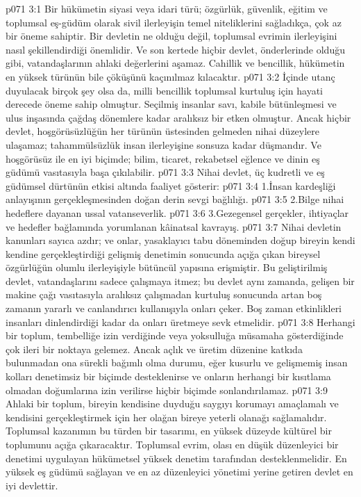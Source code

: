 \vs p071 3:1 Bir hükümetin siyasi veya idari türü; özgürlük, güvenlik, eğitim ve toplumsal eş\hyp{}güdüm olarak sivil ilerleyişin temel niteliklerini sağladıkça, çok az bir öneme sahiptir. Bir devletin ne olduğu değil, toplumsal evrimin ilerleyişini nasıl şekillendirdiği önemlidir. Ve son kertede hiçbir devlet, önderlerinde olduğu gibi, vatandaşlarının ahlaki değerlerini aşamaz. Cahillik ve bencillik, hükümetin en yüksek türünün bile çöküşünü kaçınılmaz kılacaktır.
\vs p071 3:2 İçinde utanç duyulacak birçok şey olsa da, milli bencillik toplumsal kurtuluş için hayati derecede öneme sahip olmuştur. Seçilmiş insanlar savı, kabile bütünleşmesi ve ulus inşasında çağdaş dönemlere kadar aralıksız bir etken olmuştur. Ancak hiçbir devlet, hoşgörüsüzlüğün her türünün üstesinden gelmeden nihai düzeylere ulaşamaz; tahammülsüzlük insan ilerleyişine sonsuza kadar düşmandır. Ve hoşgörüsüz ile en iyi biçimde; bilim, ticaret, rekabetsel eğlence ve dinin eş güdümü vasıtasıyla başa çıkılabilir.
\vs p071 3:3 Nihai devlet, üç kudretli ve eş güdümsel dürtünün etkisi altında faaliyet gösterir:
\vs p071 3:4 1.\bibnobreakspace İnsan kardeşliği anlayışının gerçekleşmesinden doğan derin sevgi bağlılığı.
\vs p071 3:5 2.\bibnobreakspace Bilge nihai hedeflere dayanan ussal vatanseverlik.
\vs p071 3:6 3.\bibnobreakspace Gezegensel gerçekler, ihtiyaçlar ve hedefler bağlamında yorumlanan kâinatsal kavrayış.
\vs p071 3:7 Nihai devletin kanunları sayıca azdır; ve onlar, yasaklayıcı tabu döneminden doğup bireyin kendi kendine gerçekleştirdiği gelişmiş denetimin sonucunda açığa çıkan bireysel özgürlüğün olumlu ilerleyişiyle bütüncül yapısına erişmiştir. Bu geliştirilmiş devlet, vatandaşlarını sadece çalışmaya itmez; bu devlet aynı zamanda, gelişen bir makine çağı vasıtasıyla aralıksız çalışmadan kurtuluş sonucunda artan boş zamanın yararlı ve canlandırıcı kullanışıyla onları çeker. Boş zaman etkinlikleri insanları dinlendirdiği kadar da onları üretmeye sevk etmelidir.
\vs p071 3:8 Herhangi bir toplum, tembelliğe izin verdiğinde veya yoksulluğa müsamaha gösterdiğinde çok ileri bir noktaya gelemez. Ancak açlık ve üretim düzenine katkıda bulunmadan ona sürekli bağımlı olma durumu, eğer kusurlu ve gelişmemiş insan kolları denetimsiz bir biçimde desteklenirse ve onların herhangi bir kısıtlama olmadan doğumlarına izin verilirse hiçbir biçimde sonlandırılamaz.
\vs p071 3:9 Ahlaki bir toplum, bireyin kendisine duyduğu saygıyı korumayı amaçlamalı ve kendisini gerçekleştirmek için her olağan bireye yeterli olanağı sağlamalıdır. Toplumsal kazanımın bu türden bir tasarımı, en yüksek düzeyde kültürel bir toplumunu açığa çıkaracaktır. Toplumsal evrim, olası en düşük düzenleyici bir denetimi uygulayan hükümetsel yüksek denetim tarafından desteklenmelidir. En yüksek eş güdümü sağlayan ve en az düzenleyici yönetimi yerine getiren devlet en iyi devlettir.
